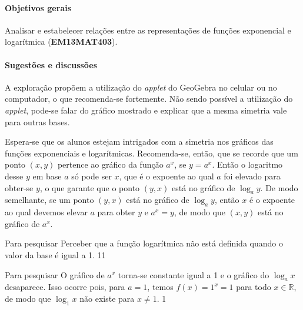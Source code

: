 \clearpage
\def\currentcolor{session1}
\begin{texto}
{
	\paragraph{Objetivos gerais}
	Analisar e estabelecer relações entre as representações de funções exponencial e logarítmica (\textbf{EM13MAT403}).

	\paragraph{Sugestões e discussões}
	A exploração propõem a utilização do \textit{applet} do GeoGebra no celular ou no computador, o que recomenda-se fortemente. Não sendo possível a utilização do \textit{applet}, pode-se falar do gráfico mostrado e explicar que a mesma simetria vale para outras bases.

	Espera-se que os alunos estejam intrigados com a simetria nos gráficos das funções exponenciais e logarítmicas. Recomenda-se, então, que se recorde que um ponto $(x,y)$ pertence ao gráfico da função $a^x$, se $y=a^x$. Então o logaritmo desse $y$ em base $a$ só pode ser $x$, que é o expoente ao qual $a$ foi elevado para obter-se $y$, o que garante que o ponto $(y,x)$ está no gráfico de $\log_a y$. De modo semelhante, se um ponto $(y,x)$ está no gráfico de $\log_a y$, então $x$ é o expoente ao qual devemos elevar $a$ para obter $y$ e $a^x=y$, de modo que $(x,y)$ está no gráfico de $a^x$.
}
\end{texto}
\begin{objectives}{Para pesquisar}
{
	Perceber que a função logarítmica não está definida quando o valor da base é igual a 1.
}{1}{1}
\end{objectives}
\begin{answer}{Para pesquisar}
{
	O gráfico de $a^x$ torna-se constante igual a 1 e o gráfico do $\log_a x$ desaparece. Isso ocorre pois, para $a=1$, temos $f(x)=1^x =1$ para todo $x \in \mathbb{R}$, de modo que $\log_1 x$ não existe para $x \neq 1$.
}{1}
\end{answer}
\clearmargin
